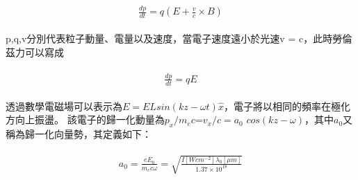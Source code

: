 \begin{align}
  \begin{split}
    \frac{dp}{dt} = q(E + \frac{v}{c}\times B)
  \end{split}
\end{align}

p,q,v分別代表粒子動量、電量以及速度，當電子速度遠小於光速v = c，此時勞倫茲力可以寫成

\begin{align}
  \begin{split}
    \frac{dp}{dt} = qE
  \end{split}
\end{align}

透過數學電磁場可以表示為\(E = ELsin(kz − \omega t)\hat{x} \)，電子將以相同的頻率在極化方向上振盪。 該電子的歸一化動量為\(p_{x}/m_{e} c\)=\(v_{x}/c=a_{0}\) \(cos⁡(kz-\omega)\)，其中\(a_{0}\)又稱為歸一化向量勢，其定義如下：

\begin{align}
  \begin{split}
    a_{0} = \frac{eE_{0}}{m_{e}c\omega} = \sqrt{\frac{I[W cm^{-2}]\lambda_0[\mu m]}{1.37 \times 10^{18}}}
  \end{split}
\end{align}

